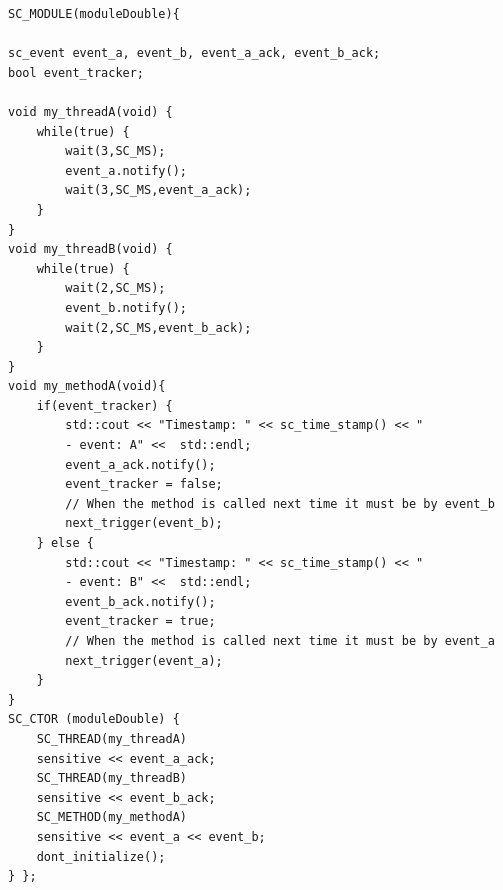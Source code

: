 \begin{lstlisting}[style=customc++, caption=Implementation of ModuleDouble.,
label={lst:moduledoubleheader}]
SC_MODULE(moduleDouble){

sc_event event_a, event_b, event_a_ack, event_b_ack;
bool event_tracker;

void my_threadA(void) {
	while(true) {
		wait(3,SC_MS);
		event_a.notify();
		wait(3,SC_MS,event_a_ack);
	}
}
void my_threadB(void) {
	while(true) {
		wait(2,SC_MS);
		event_b.notify();
		wait(2,SC_MS,event_b_ack);
	}
}
void my_methodA(void){
	if(event_tracker) {
		std::cout << "Timestamp: " << sc_time_stamp() << "
		- event: A" <<  std::endl;
		event_a_ack.notify();
		event_tracker = false;
		// When the method is called next time it must be by event_b
		next_trigger(event_b);
	} else {
		std::cout << "Timestamp: " << sc_time_stamp() << "
		- event: B" <<  std::endl;
		event_b_ack.notify();
		event_tracker = true;
		// When the method is called next time it must be by event_a
		next_trigger(event_a);
	}
}
SC_CTOR (moduleDouble) {
	SC_THREAD(my_threadA)
	sensitive << event_a_ack;
	SC_THREAD(my_threadB)
	sensitive << event_b_ack;
	SC_METHOD(my_methodA)
	sensitive << event_a << event_b;
	dont_initialize();
} };
\end{lstlisting}